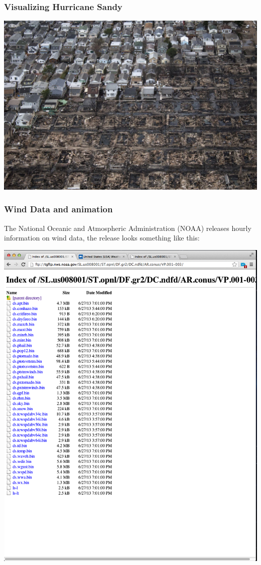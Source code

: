 \documentclass{beamer} %
\newcommand{\1}{\mathbb{1}}
\begin{document}
{		\begin{frame}[t]\frametitle{Visualizing Hurricane Sandy}
		\includegraphics[scale = 0.7]{./visualization/sandy3.jpg}
		\end{frame}


		\begin{frame}[t]\frametitle{Wind Data and animation}
			The National Oceanic and Atmospheric Administration (NOAA) releases hourly information on wind data, the release looks something like this:\\
			\pause
			\begin{center}
			\includegraphics[scale = 0.15]{./visualization/windData_db.png}\\
			\end{center}
		\end{frame}

}
\end{document}
